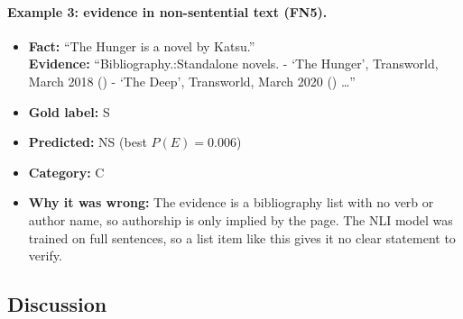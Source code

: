 \documentclass[12pt,a4paper]{article}
\begin{document}
\paragraph{Example 3: evidence in non-sentential text (FN5).}
\begin{itemize}[leftmargin=1.2em]
\item[(a)] \textbf{Fact:} ``The Hunger is a novel by Katsu.''\\
\textbf{Evidence:} ``Bibliography.:Standalone novels. - `The Hunger', Transworld, March 2018 () - `The Deep', Transworld, March 2020 () \dots''
\item[(b)] \textbf{Gold label:} S
\item[(c)] \textbf{Predicted:} NS (best $P(E) = 0.006$)
\item[(d)] \textbf{Category:} C
\item[(e)] \textbf{Why it was wrong:} The evidence is a bibliography list with no verb or author name, so authorship is only implied by the page. The NLI model was trained on full sentences, so a list item like this gives it no clear statement to verify.
\end{itemize}

\subsection{Discussion}
\label{sec:noise}

\end{document}
